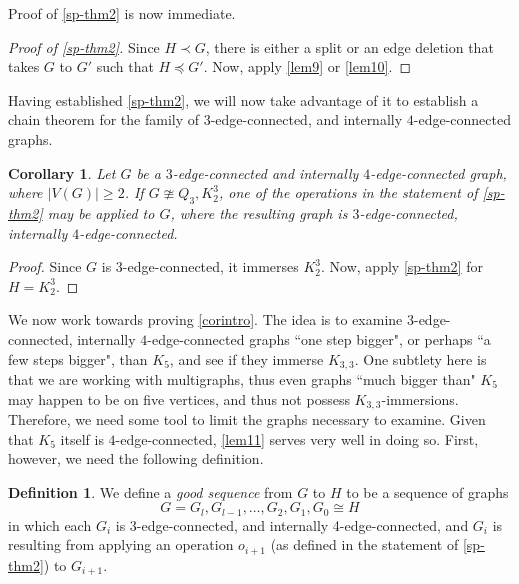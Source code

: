 \documentclass[letterpaper,11pt]{article}
\newtheorem{cor}[theorem]{Corollary}
\theoremstyle{definition}
\newtheorem*{definition}{Definition}
\begin{document}
Proof of \cref{sp-thm2} is now immediate.


\begin{proof}[Proof of \cref{sp-thm2}]
	Since $H \prec G$, there is either a split  or an edge deletion that takes $G$ to $G'$ such that $H\preceq G'$. Now, apply  \cref{lem9} or \cref{lem10}.
\end{proof}

Having established \cref{sp-thm2}, we will now take advantage of it to establish a chain theorem for the family of $3$-edge-connected, and internally $4$-edge-connected graphs.


\begin{cor}
	\label{sp-chain-3ec-int4ec}
	Let $G$ be a $3$-edge-connected and internally $4$-edge-connected graph, where $|V(G)| \ge 2$. If $G\ncong Q_3, K_2^3$, one of the operations in the statement of \cref{sp-thm2} may be applied to $G$, where the resulting graph is $3$-edge-connected, internally $4$-edge-connected.
\end{cor}

\begin{proof}
	Since $G$ is $3$-edge-connected, it immerses $K_2^3$. Now, apply \cref{sp-thm2} for $H = K_2^3$.
\end{proof}

We now work towards proving \cref{corintro}. The idea is to examine $3$-edge-connected, internally $4$-edge-connected graphs ``one step bigger", or perhaps ``a few steps bigger", than $K_5$, and see if they immerse $K_{3,3}$. One subtlety here is that we are working with multigraphs, thus even graphs ``much bigger than" $K_5$ may happen to be on five vertices, and thus not possess $K_{3,3}$-immersions. Therefore, we need some tool to limit the graphs necessary to examine. Given that $K_5$ itself is $4$-edge-connected, \cref{lem11} serves very well in doing so. First, however, we need the following definition.

\begin{definition}
We define a \emph{good sequence} from $G$ to $H$ to be a sequence of graphs
$$G=G_l, G_{l-1}, \ldots , G_2, G_1, G_0\cong H$$
in which each $G_i$ is 3-edge-connected, and internally 4-edge-connected, and $G_i$ is resulting from applying an operation $o_{i+1}$ (as defined in the statement of \cref{sp-thm2}) to $G_{i+1}$.
\end{definition}
\end{document}

